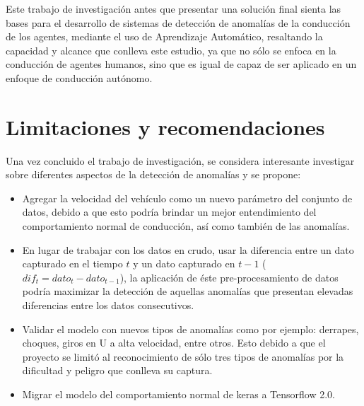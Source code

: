 Este trabajo de investigaci\'{o}n antes que presentar una soluci\'{o}n final sienta las bases para el desarrollo de sistemas de detecci\'{o}n de anomal\'{i}as de la conducci\'{o}n de los agentes, mediante el uso de Aprendizaje Autom\'{a}tico, resaltando la capacidad y alcance que conlleva este estudio, ya que no s\'{o}lo se enfoca en la conducci\'{o}n de agentes humanos, sino que es igual de capaz de ser aplicado en un enfoque de conducci\'{o}n aut\'{o}nomo.

\section{Limitaciones y recomendaciones}

Una vez concluido el trabajo de investigaci\'{o}n, se considera interesante investigar sobre diferentes aspectos de la detecci\'{o}n de anomal\'{i}as y se propone:

\begin{itemize}
\item Agregar la velocidad del veh\'{i}culo como un nuevo par\'{a}metro del conjunto de datos, debido a que esto podr\'{i}a brindar un mejor entendimiento del comportamiento normal de conducci\'{o}n, as\'{i} como tambi\'{e}n de las anomal\'{i}as.
\item En lugar de trabajar con los datos en crudo, usar la diferencia entre un dato capturado en el tiempo $t$ y un dato capturado en $t-1$ ($dif_{t} = dato_{t}-dato_{t-1}$), la aplicaci\'{o}n de \'{e}ste pre-procesamiento de datos podr\'{i}a maximizar la detecci\'{o}n de aquellas anomal\'{i}as que presentan elevadas diferencias entre los datos consecutivos.
\item Validar el modelo con nuevos tipos de anomal\'{i}as como por ejemplo: derrapes, choques, giros en U a alta velocidad, entre otros. Esto debido a que el proyecto se limit\'{o} al reconocimiento de s\'{o}lo tres tipos de anomal\'{i}as por la dificultad y peligro que conlleva su captura.
\item Migrar el modelo del comportamiento normal de keras a Tensorflow 2.0.

\end{itemize}

 

